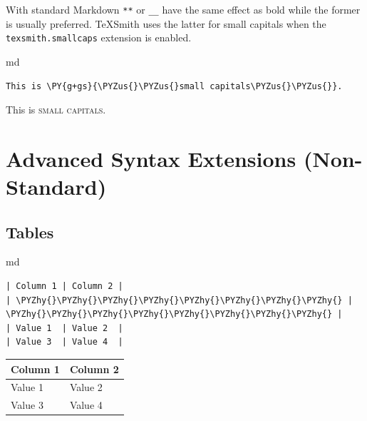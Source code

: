 \documentclass[a4paper,twoside]{article}
\begin{document}
With standard Markdown \texttt{**} or \texttt{\_\_} have the same effect as bold while the former is usually preferred. TeXSmith uses the latter for small capitals when the \texttt{texsmith.smallcaps}
extension is enabled.

\begin{code}{md}{}{}
\begin{Verbatim}[commandchars=\\\{\},breaklines, breakanywhere, commandchars=\\\{\}]
This is \PY{g+gs}{\PYZus{}\PYZus{}small capitals\PYZus{}\PYZus{}}.
\end{Verbatim}
\end{code}
\begin{displayquote}

This is \textsc{small capitals}.

\end{displayquote}
\section{Advanced Syntax Extensions (Non-Standard)}\label{advanced-syntax-extensions-non-standard}

\subsection{Tables}\label{tables}

\begin{code}{md}{}{}
\begin{Verbatim}[commandchars=\\\{\},breaklines, breakanywhere, commandchars=\\\{\}]
| Column 1 | Column 2 |
| \PYZhy{}\PYZhy{}\PYZhy{}\PYZhy{}\PYZhy{}\PYZhy{}\PYZhy{}\PYZhy{} | \PYZhy{}\PYZhy{}\PYZhy{}\PYZhy{}\PYZhy{}\PYZhy{}\PYZhy{}\PYZhy{} |
| Value 1  | Value 2  |
| Value 3  | Value 4  |
\end{Verbatim}
\end{code}
\begin{displayquote}

\begin{center}
\begin{tabularx}{\linewidth}{>{\raggedright\arraybackslash}X>{\raggedright\arraybackslash}X}
\toprule
\textbf{Column 1} & \textbf{Column 2} \\

\midrule
Value 1 & Value 2 \\
Value 3 & Value 4 \\

\bottomrule
\end{tabularx}
\end{center}

\end{displayquote}
\end{document}
